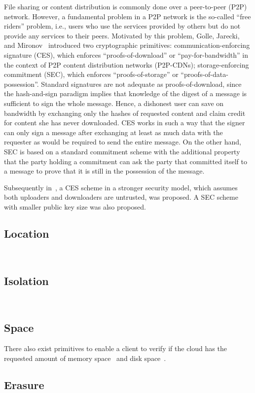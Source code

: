 File sharing or content distribution is commonly done over a peer-to-peer (P2P) network. However, a fundamental problem in a P2P network is the so-called ``free riders'' problem, i.e., users who use the services provided by others but do not provide any services to their peers. 
Motivated by this problem, Golle, Jarecki, and Mironov~\cite{GJM02} introduced two cryptographic primitives:
communication-enforcing signature (CES), which enforces ``proofs-of-download'' or ``pay-for-bandwidth'' in the context of P2P content distribution networks (P2P-CDNs);
storage-enforcing commitment (SEC), which enforces ``proofs-of-storage'' or ``proofs-of-data-possession''.
Standard signatures are not adequate as proofs-of-download, since the hash-and-sign paradigm implies that knowledge of the digest of a message is sufficient to sign the whole message. Hence, a dishonest user can save on bandwidth by exchanging only the hashes of requested content and claim credit for content she has never downloaded. CES works in such a way that the signer can only sign a message after exchanging at least as much data with the requester as would be required to send the entire message. On the other hand, SEC is based on a standard commitment scheme with the additional property that the party holding a commitment can ask the party that committed itself to a message to prove that it is still in the possession of the message.

Subsequently in~\cite{FB06}, a CES scheme in a stronger security model, which assumes both uploaders and downloaders are untrusted, was proposed. A SEC scheme with smaller public key size was also proposed.



\subsection{Location}

~\cite{WSA+12}

\subsection{Isolation}

~\cite{WSJ+12,WSJ+13,WSJ+14}

\subsection{Space}

There also exist primitives to enable a client to verify if the cloud has the requested amount of memory space~\cite{ABF13} and disk space~\cite{DFK+13}.

\subsection{Erasure}

~\cite{PT10}

